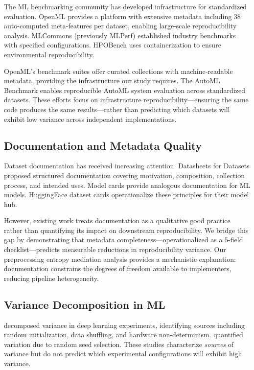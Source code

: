 The ML benchmarking community has developed infrastructure for standardized evaluation. OpenML \citep{vanschoren2014openml} provides a platform with extensive metadata including 38 auto-computed meta-features per dataset, enabling large-scale reproducibility analysis. MLCommons (previously MLPerf) established industry benchmarks with specified configurations. HPOBench \citep{eggensperger2021hpobench} uses containerization to ensure environmental reproducibility.

OpenML's benchmark suites offer curated collections with machine-readable metadata, providing the infrastructure our study requires. The AutoML Benchmark \citep{gijsbers2019automl} enables reproducible AutoML system evaluation across standardized datasets. These efforts focus on infrastructure reproducibility---ensuring the same code produces the same results---rather than predicting which datasets will exhibit low variance across independent implementations.

\subsection{Documentation and Metadata Quality}

Dataset documentation has received increasing attention. Datasheets for Datasets \citep{gebru2021datasheets} proposed structured documentation covering motivation, composition, collection process, and intended uses. Model cards \citep{mitchell2019model} provide analogous documentation for ML models. HuggingFace dataset cards operationalize these principles for their model hub.

However, existing work treats documentation as a qualitative good practice rather than quantifying its impact on downstream reproducibility. We bridge this gap by demonstrating that metadata completeness---operationalized as a 5-field checklist---predicts measurable reductions in reproducibility variance. Our preprocessing entropy mediation analysis provides a mechanistic explanation: documentation constrains the degrees of freedom available to implementers, reducing pipeline heterogeneity.

\subsection{Variance Decomposition in ML}

\citet{bouthillier2021variance} decomposed variance in deep learning experiments, identifying sources including random initialization, data shuffling, and hardware non-determinism. \citet{picard2021torch} quantified variation due to random seed selection. These studies characterize \emph{sources} of variance but do not predict which experimental configurations will exhibit high variance.

